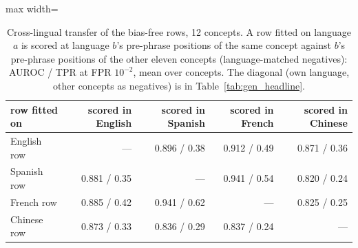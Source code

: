 \begin{table}[t]
\centering
\footnotesize
\caption{Cross-lingual transfer of the bias-free rows, 12 concepts. A row fitted on language $a$ is scored at language $b$'s pre-phrase positions of the same concept against $b$'s pre-phrase positions of the other eleven concepts (language-matched negatives): AUROC / TPR at FPR $10^{-2}$, mean over concepts. The diagonal (own language, other concepts as negatives) is in Table~\ref{tab:gen_headline}.}
\label{tab:gen_xling}
\begin{adjustbox}{max width=\textwidth}
\begin{tabular}{lrrrr}
\toprule
row fitted on & scored in English & scored in Spanish & scored in French & scored in Chinese \\
\midrule
English row & --- & 0.896 / 0.38 & 0.912 / 0.49 & 0.871 / 0.36 \\
Spanish row & 0.881 / 0.35 & --- & 0.941 / 0.54 & 0.820 / 0.24 \\
French row & 0.885 / 0.42 & 0.941 / 0.62 & --- & 0.825 / 0.25 \\
Chinese row & 0.873 / 0.33 & 0.836 / 0.29 & 0.837 / 0.24 & --- \\
\bottomrule
\end{tabular}
\end{adjustbox}
\end{table}